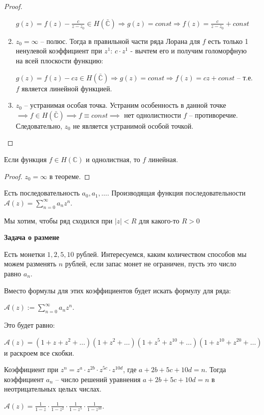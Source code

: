 \begin{proof}
\begin{enumerate}
{            $g(z) = f(z) - \frac{c}{z - z_0} \in H(\bar{\mathbb{C}}) \Rightarrow g(z) = const \Rightarrow f(z) = \frac{c}{z - z_0} + const$
        }
        \item {
            $z_0 = \infty$ -- полюс. Тогда в правильной части ряда Лорана для $f$ есть только 1 ненулевой коэффициент при $z^1$: $c\cdot z^1$ - вычтем его и получим голоморфную на всей плоскости функцию:

            $g(z) = f(z) - cz \in H(\bar{\mathbb{C}}) \Rightarrow g(z) = const \Rightarrow f(z) = cz + const$ -- т.е. $f$ является линейной функцией.
        }
        \item {
            $z_0$ -- устранимая особая точка. Устраним особенность в данной точке $\implies f \in H(\bar{\mathbb{C}}) \implies f \equiv const \implies$ нет однолистности $f$ -- противоречие. Следовательно, $z_0$ не является устранимой особой точкой.
        }
    \end{enumerate}
\end{proof}

\begin{consequence}
    Если функция $f \in H(\mathbb{C})$ и однолистная, то $f$ линейная.
\end{consequence}

\begin{proof}
    $z_0 = \infty$ в теореме.
\end{proof}


\begin{definition}
    Есть последовательность $a_0, a_1, \ldots$. Производящая функция последовательности
    $\mathcal{A}(z) = \sum_{n = 0}^{\infty} a_nz^n$.

    Мы хотим, чтобы ряд сходился при $|z| < R$ для какого-то $R > 0$
\end{definition}

\begin{example}
    \textbf{Задача о размене}

    Есть монетки $1, 2, 5, 10$ рублей. Интересуемся, каким количеством способов мы можем разменять $n$ рублей, если запас монет не ограничен, пусть это число равно $a_n$.

    Вместо формулы для этих коэффициентов будет искать формулу для ряда:

    $\mathcal{A}(z) := \sum_{n=0}^{\infty} a_n z^n$.

    Это будет равно:

    $\mathcal{A}(z) = (1 + z + z^2 + \ldots)(1 + z^2 + \ldots)(1 + z^5 + z^{10} + \ldots)(1 + z^{10} + z^{20} + \ldots)$ и
    раскроем все скобки.

    Коэффициент при $z^n = z^a \cdot z^{2b} \cdot z^{5c} \cdot z^{10d}$, где $a + 2b + 5c + 10d = n$.
    Тогда коэффициент $a_n$ -- число решений уравнения $a + 2b + 5c + 10d = n$ в неотрицательных целых числах.

    $\mathcal{A}(z) = \frac{1}{1 - z} \cdot \frac{1}{1 - z^2} \cdot \frac{1}{1 - z^5} \cdot \frac{1}{1 - z^{10}}$.
\end{example}

